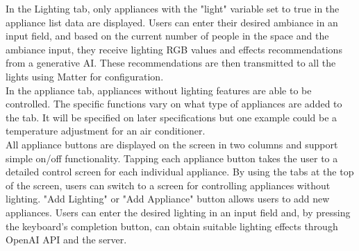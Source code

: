 \documentclass[conference]{IEEEtran}
\begin{document}
        In the Lighting tab, only appliances with the "light" variable set to true in the appliance list data are displayed.  Users can enter their desired ambiance in an input field, and based on the current number of people in the space and the ambiance input, they receive lighting RGB values and effects recommendations from a generative AI. These recommendations are then transmitted to all the lights using Matter for configuration.\\
        In the appliance tab, appliances without lighting features are able to be controlled. The specific functions vary on what type of appliances are added to the tab. It will be specified on later specifications but one example could be a temperature adjustment for an air conditioner.\\
        All appliance buttons are displayed on the screen in two columns and support simple on/off functionality. Tapping each appliance button takes the user to a detailed control screen for each individual appliance. By using the tabs at the top of the screen, users can switch to a screen for controlling appliances without lighting. "Add Lighting" or "Add Appliance" button allows users to add new appliances. Users can enter the desired lighting in an input field and, by pressing the keyboard's completion button, can obtain suitable lighting effects through OpenAI API and the server.
\end{document}
